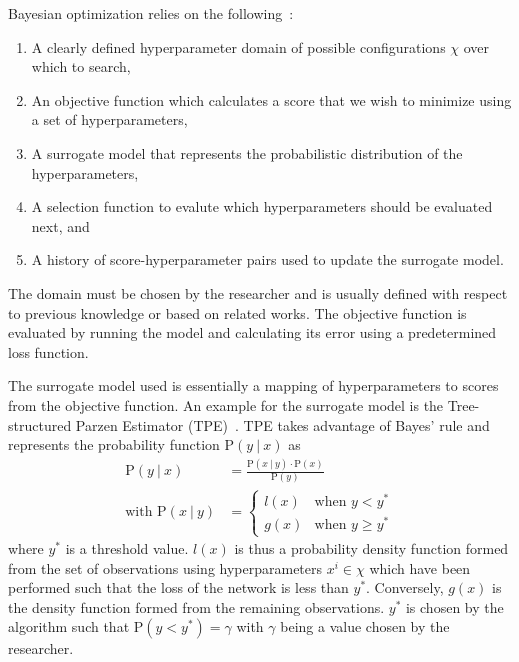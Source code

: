 Bayesian optimization relies on the following~\cite{bayesiantds}:
\begin{enumerate}
	\itemsep-1em
	\item A clearly defined hyperparameter domain of possible configurations $\chi$ over which to search,
	\item An objective function which calculates a score that we wish to minimize using a set of hyperparameters,
	\item A surrogate model that represents the probabilistic distribution of the hyperparameters,
	\item A selection function to evalute which hyperparameters should be evaluated next, and
	\item A history of score-hyperparameter pairs used to update the surrogate model.
\end{enumerate}
The domain must be chosen by the researcher and is usually defined with respect to previous knowledge or based on related works.
The objective function is evaluated by running the model and calculating its error using a predetermined loss function.

The surrogate model used is essentially a mapping of hyperparameters to scores from the objective function.
An example for the surrogate model is the Tree-structured Parzen Estimator (TPE)~\cite{tpe}.
TPE takes advantage of Bayes' rule and represents the probability function $\text{P}(y~|~x)$ as
\begin{equation}\label{eq:bohb-1}
	\begin{split}
		\text{P}(y~|~x) &= \frac{\text{P}(x~|~y) \cdot \text{P}(x)}{\text{P}(y)}\\
		\text{with } \text{P}(x~|~y) &=
		\begin{cases}
		l(x) &\text{when } y < y^* \\
		g(x) &\text{when } y \geq y^*
		\end{cases}
	\end{split}
\end{equation}
where $y^*$ is a threshold value. $l(x)$ is thus a probability density function formed from the set of observations using hyperparameters $x^i \in \chi$ which have been performed such that the loss of the network is less than $y^*$. 
Conversely, $g(x)$ is the density function formed from the remaining observations.
$y^*$ is chosen by the algorithm such that $\text{P}(y<y^*) = \gamma$ with $\gamma$ being a value chosen by the researcher.

